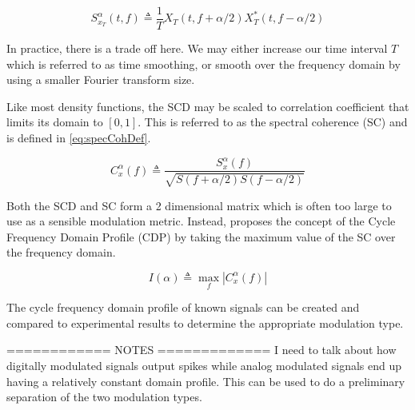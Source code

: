 \begin{equation}
S_{x_T}^{\alpha}(t,f) \triangleq \frac{1}{T} X_T(t,f + \alpha / 2)X_T^*(t,f - \alpha / 2)
\label{eq:ScdDefined2}
\end{equation}

In practice, there is a trade off here.  We may either increase our time
interval $T$ which is referred to as time smoothing, or smooth over the frequency
domain by using a smaller Fourier transform size.

Like most density functions, the SCD may be scaled to correlation
coefficient that limits its domain to $[0,1]$. This is referred to as the
spectral coherence (SC) and is defined in \ref{eq:specCohDef}.

\begin{equation}
C_{x}^{\alpha}(f) \triangleq \frac{S_x^{\alpha}(f)}{\sqrt{S(f+\alpha/2)S(f-\alpha/2)}}
\label{eq:specCohDef}
\end{equation}


Both the SCD and SC form a 2 dimensional matrix which is often
too large to use as a sensible modulation metric.  Instead, \cite{kim2007}
proposes the concept of the Cycle Frequency Domain Profile (CDP) by taking the
maximum value of the SC over the frequency domain.

\begin{equation}
I(\alpha) \triangleq \max_f |C_x^{\alpha}(f)|
\label{eq:CdpDef}
\end{equation}

The cycle frequency domain profile of known signals can be created and compared
to experimental results to determine the appropriate modulation type.

============ NOTES =============
I need to talk about how digitally modulated signals output spikes while analog
modulated signals end up having a relatively constant domain profile.  This can
be used to do a preliminary separation of the two modulation types.



